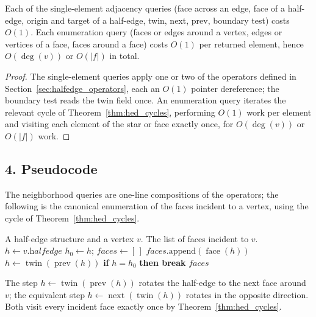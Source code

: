 \begin{theorem}\label{thm:hed_query}
Each of the single-element adjacency queries (face across an edge, face of
a half-edge, origin and target of a half-edge, twin, next, prev, boundary
test) costs $O(1)$. Each enumeration query (faces or edges around a vertex,
edges or vertices of a face, faces around a face) costs $O(1)$ per returned
element, hence $O(\deg(v))$ or $O(|f|)$ in total.
\end{theorem}

\begin{proof}
The single-element queries apply one or two of the operators defined in
Section~\ref{sec:halfedge_operators}, each an $O(1)$ pointer dereference;
the boundary test reads the twin field once. An enumeration query iterates
the relevant cycle of Theorem~\ref{thm:hed_cycles}, performing $O(1)$ work
per element and visiting each element of the star or face exactly once, for
$O(\deg(v))$ or $O(|f|)$ work.
\end{proof}

\subsection{4. Pseudocode}

The neighborhood queries are one-line compositions of the operators; the
following is the canonical enumeration of the faces incident to a vertex,
using the cycle of Theorem~\ref{thm:hed_cycles}.

\begin{algorithm}[htbp]
\caption{Enumerate Faces Around a Vertex}
\label{alg:hed_neighbors}
\begin{algorithmic}[1]
\Require A half-edge structure and a vertex $v$.
\Ensure The list of faces incident to $v$.
  \State $h \gets v.\textit{halfedge}$ 
  \State $h_0 \gets h$; $\mathit{faces} \gets [\,]$
  \Loop
    \State $\mathit{faces}.\text{append}(\operatorname{face}(h))$
    \State $h \gets \operatorname{twin}(\operatorname{prev}(h))$
    \State \textbf{if} $h = h_0$ \textbf{then break}
  \EndLoop
  \State \Return $\mathit{faces}$
\EndFunction
\end{algorithmic}
\end{algorithm}

\begin{remark}
The step $h \leftarrow \operatorname{twin}(\operatorname{prev}(h))$ rotates
the half-edge to the next face around $v$; the equivalent step
$h \leftarrow \operatorname{next}(\operatorname{twin}(h))$ rotates in the
opposite direction. Both visit every incident face exactly once by
Theorem~\ref{thm:hed_cycles}.
\end{remark}

